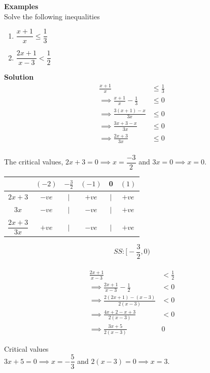 \documentclass[11pt,a4paper]{article}
\begin{document}
\textbf{Examples}\\
Solve the following inequalities
\begin{enumerate}
\item[(a).] $\dfrac{x+1}{x}\leq \dfrac{1}{3}$
\item[(b).] $\dfrac{2x+1}{x-3}<\dfrac{1}{2}$\\
\end{enumerate}

\textbf{Solution}
\begin{align*}
\frac{x+1}{x} & \leq \frac{1}{3}\\
\implies \frac{x+1}{x}-\frac{1}{3} & \leq 0\\
\implies \frac{3(x+1)-x}{3x} & \leq 0\\
\implies \frac{3x+3-x}{3x} & \leq 0\\
\implies \frac{2x+3}{3x} & \leq 0\\
\end{align*}


The critical values, $2x+3=0\implies x=\dfrac{-3}{2}$ and $3x=0\implies x=0$.

\begin{table}[H]
\centering
\begin{tabular}{cccccc}
& $(-2)$ & $-\frac{3}{2}$ & $(-1)$ & 0 & $(1)$\\
\hline
\multicolumn{1}{c|}{$2x+3$}  & $-ve$ & $|$ & $+ve$ & $|$ & $+ve$\\
\multicolumn{1}{c|}{$3x$}    & $-ve$ & $|$ & $-ve$ & $|$ & $+ve$\\
\multicolumn{1}{c|}{}&&&&&\\
\multicolumn{1}{c|}{$\dfrac{2x+3}{3x}$}  & $+ve$ & $|$ & $-ve$ & $|$ & $+ve$\\
\end{tabular}
\end{table}

$$SS:\bigg[-\frac{3}{2},0\bigg)$$\\

\begin{align*}
\frac{2x+1}{x-3} & < \frac{1}{2}\\
\implies \frac{2x+1}{x-3}-\frac{1}{2} & <0\\
\implies \frac{2(2x+1)-(x-3)}{2(x-3)} & <0\\
\implies \frac{4x+2-x+3}{2(x-3)} & <0\\
\implies \frac{3x+5}{2(x-3)} & 0
\end{align*}

Critical values\\
$3x+5=0\implies x=-\dfrac{5}{3}$ and $2(x-3)=0\implies x=3$.
\end{document}
